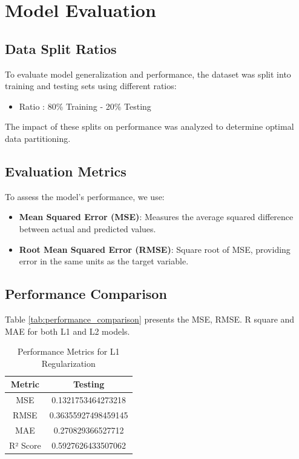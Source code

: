 \documentclass{article}
\begin{document}
\section{Model Evaluation}

\subsection{Data Split Ratios}
To evaluate model generalization and performance, the dataset was split into training and testing sets using different ratios:
\begin{itemize}
    \item Ratio : 80\% Training - 20\% Testing
\end{itemize}
The impact of these splits on performance was analyzed to determine optimal data partitioning.

\subsection{Evaluation Metrics}
To assess the model's performance, we use:
\begin{itemize}
    \item \textbf{Mean Squared Error (MSE)}: Measures the average squared difference between actual and predicted values.
    \item \textbf{Root Mean Squared Error (RMSE)}: Square root of MSE, providing error in the same units as the target variable.

\end{itemize}

\subsection{Performance Comparison}
Table \ref{tab:performance_comparison} presents the MSE, RMSE. R square and MAE for both L1 and L2 models.
\begin{table}[h]
    \centering
    \caption{Performance Metrics for L1 Regularization}
    \label{tab:l1_performance}
    \begin{tabular}{|c|c|}
        \hline
        \textbf{Metric} & \textbf{Testing} \\
        \hline
        MSE &  0.1321753464273218   \\
        \hline
        RMSE &      0.36355927498459145   \\
        \hline
        MAE &     0.270829366527712     \\
        \hline
        R² Score &   0.5927626433507062    \\
        \hline
    \end{tabular}
\end{table}
\end{document}
